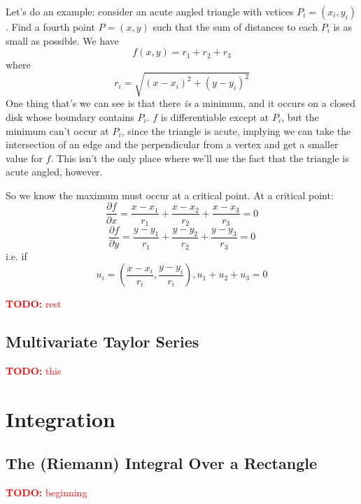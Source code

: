 \documentclass{article}
\newcommand{\prt}[2]{\frac{\partial #1}{\partial #2}}
\newcommand{\TODO}[1]{\textcolor{red}{\textbf{TODO:} #1}}
\begin{document}
Let's do an example: consider an acute angled triangle with vetices \(P_i = (x_i, y_i)\). Find a fourth point \(P = (x, y)\) such that the sum of distances to each \(P_i\) is as small as possible. We have
\begin{equation}f(x, y) = r_1 + r_2 + r_3\end{equation}
where
\begin{equation}r_i = \sqrt{(x - x_i)^2 + (y - y_i)^2}\end{equation}
One thing that's we can see is that there \textit{is} a minimum, and it occurs on a closed disk whose boundary contains \(P_i\). \(f\) is differentiable except at \(P_i\), but the minimum can't occur at \(P_i\), since the triangle is acute, implying we can take the intersection of an edge and the perpendicular from a vertex and get a smaller value for \(f\). This isn't the only place where we'll use the fact that the triangle is acute angled, however.

So we know the maximum must occur at a critical point. At a critical point:
\begin{equation}\prt{f}{x} = \frac{x - x_1}{r_1} + \frac{x - x_2}{r_2} + \frac{x - x_3}{r_3} = 0\end{equation}
\begin{equation}\prt{f}{y} = \frac{y - y_1}{r_1} + \frac{y - y_2}{r_2} + \frac{y - y_3}{r_3} = 0\end{equation}
i.e. if
\begin{equation}u_i = \left(\frac{x - x_i}{r_i}, \frac{y - y_i}{r_i}\right), u_1 + u_2 + u_3 = 0\end{equation}

\TODO{rest}

\subsection{Multivariate Taylor Series}

\TODO{this}

\section{Integration}

\subsection{The (Riemann) Integral Over a Rectangle}

\TODO{beginning}
\end{document}
